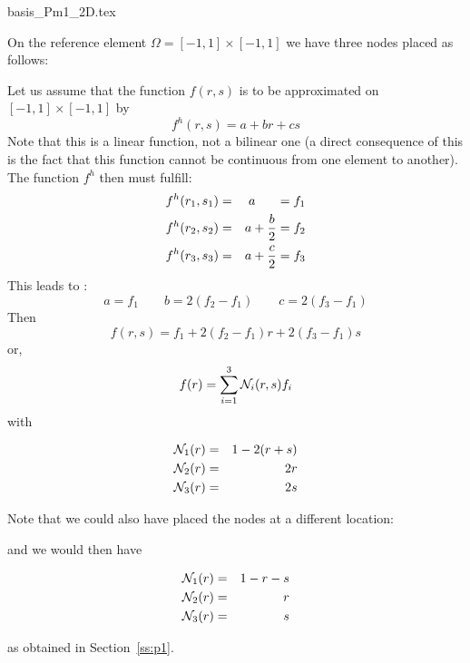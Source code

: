 \begin{flushright} {\tiny {\color{gray} basis\_Pm1\_2D.tex}} \end{flushright}

On the reference element $\Omega=[-1,1]\times[-1,1]$ we have three nodes placed as follows:



Let us assume that the function $f(r,s)$ is to be approximated on $[-1,1]\times[-1,1]$ by 
\[
f^h(r,s)=a+br+cs
\]
Note that this is a linear function, not a bilinear one (a direct consequence of this is the 
fact that this function cannot be continuous from one element to another). 
The function $f^h$ then must fulfill:
\begin{eqnarray}
f^h(r_1,s_1)&=&a \;\;\;\;\;\; =f_1    \nonumber\\
f^h(r_2,s_2)&=&a+\frac{b}{2}=f_2 \nonumber\\
f^h(r_3,s_3)&=&a+\frac{c}{2}=f_3 \nonumber
\end{eqnarray}
This leads to : 
\[
a=f_1
\quad
\quad
b=2(f_2-f_1)
\quad
\quad
c=2(f_3-f_1)
\]
Then
\[
f(r,s)=f_1 + 2(f_2-f_1) r + 2(f_3-f_1) s
\]
or, 
\[
f(r) = \sum_{i=1}^3 {\mathcal{N}}_i(r,s) f_i
\]
with
\begin{mdframed}[backgroundcolor=blue!5]
\begin{eqnarray}
{\mathcal{N}}_1(r) &=& 1-2(r+s)  \nonumber\\
{\mathcal{N}}_2(r) &=& 2r   \nonumber\\
{\mathcal{N}}_3(r) &=& 2s
\end{eqnarray}
\end{mdframed}

Note that we could also have placed the nodes at a different location: 



and we would then have
\begin{mdframed}[backgroundcolor=blue!5]
\begin{eqnarray}
{\mathcal{N}}_1(r) &=& 1-r-s  \nonumber\\
{\mathcal{N}}_2(r) &=& r   \nonumber\\
{\mathcal{N}}_3(r) &=& s
\end{eqnarray}
\end{mdframed}
as obtained in Section~\ref{ss:p1}.




